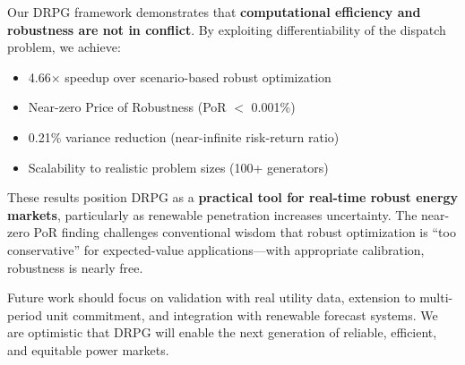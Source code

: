Our DRPG framework demonstrates that \textbf{computational efficiency and robustness are not in conflict}. By exploiting differentiability of the dispatch problem, we achieve:
\begin{itemize}
    \item 4.66$\times$ speedup over scenario-based robust optimization
    \item Near-zero Price of Robustness (PoR $<$ 0.001\%)
    \item 0.21\% variance reduction (near-infinite risk-return ratio)
    \item Scalability to realistic problem sizes (100+ generators)
\end{itemize}

These results position DRPG as a \textbf{practical tool for real-time robust energy markets}, particularly as renewable penetration increases uncertainty. The near-zero PoR finding challenges conventional wisdom that robust optimization is ``too conservative'' for expected-value applications—with appropriate calibration, robustness is nearly free.

Future work should focus on validation with real utility data, extension to multi-period unit commitment, and integration with renewable forecast systems. We are optimistic that DRPG will enable the next generation of reliable, efficient, and equitable power markets.
